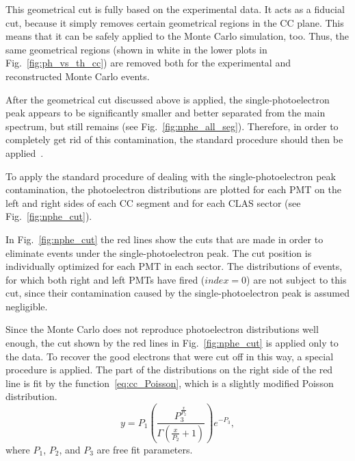 
This geometrical cut is fully based on the experimental data. It acts as a fiducial cut, because it simply removes certain geometrical regions in the CC plane. This means that it can be safely applied to the Monte Carlo simulation, too. Thus, the same geometrical regions (shown in white in the lower plots in Fig.~\ref{fig:ph_vs_th_cc}) are removed both for the experimental and reconstructed Monte Carlo events.


After the geometrical cut discussed above is applied, the single-photoelectron peak appears to be significantly smaller and better separated from the main spectrum, but still remains (see Fig.~\ref{fig:nphe_all_seg}). Therefore, in order to completely get rid of this contamination, the standard procedure should then be applied~\cite{Fed_an_note:2007}. 


To apply the standard procedure of dealing with the single-photoelectron peak contamination, the photoelectron distributions are plotted for each PMT on the left and right sides of each CC segment and for each CLAS sector (see Fig.~\ref{fig:nphe_cut}). 


In Fig.~\ref{fig:nphe_cut} the red lines show the cuts that are made in order to eliminate events under the single-photoelectron peak. The cut position is individually optimized for each PMT in each sector. The distributions of events, for which both right and left PMTs have fired ($index = 0$) are not subject to this cut, since their contamination caused by the single-photoelectron peak is assumed negligible.


Since the Monte Carlo does not reproduce photoelectron distributions well enough, the cut shown by the red lines in Fig.~\ref{fig:nphe_cut} is applied only to the data. To recover the good electrons that were cut off in this way, a special procedure is applied. The part of the distributions on the right side of the red line is fit by the function~\eqref{eq:cc_Poisson}, which is a slightly modified Poisson distribution. 
\begin{equation}
y = P_{1}\left(\frac{P_{3}^{\frac{x}{P_{2}}}}{\Gamma\left(\frac{x}{P_{2}}+1\right)}
\right)e^{-P_{3}},
\label{eq:cc_Poisson}
\end{equation}
where $P_{1}$, $P_{2}$, and $P_{3}$ are free fit parameters.






